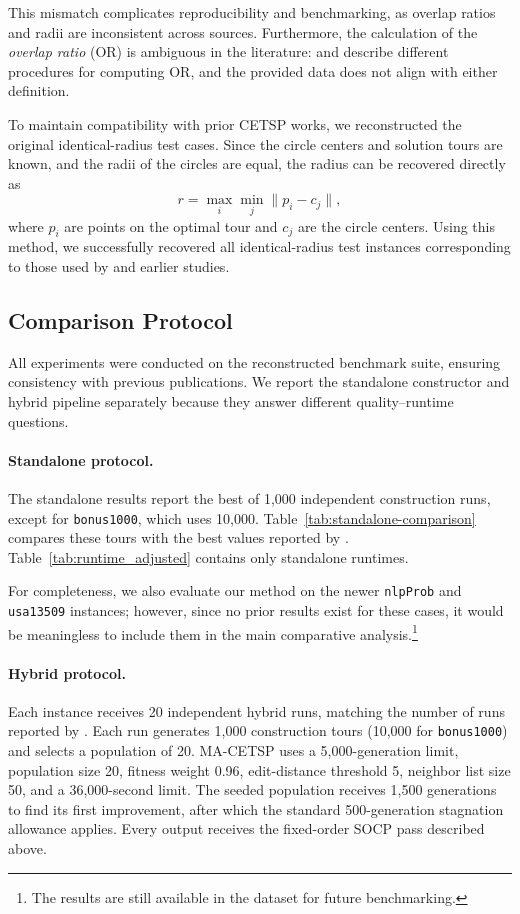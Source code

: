 \documentclass[11pt]{article}
\begin{document}
This mismatch complicates reproducibility and benchmarking, as overlap ratios and radii are inconsistent across sources.
Furthermore, the calculation of the \emph{overlap ratio} (OR) is ambiguous in the literature:
\textcite{Mennell2009} and \textcite{DiPlacido2022} describe different procedures for computing OR, and the provided data does not align with either definition.

To maintain compatibility with prior CETSP works, we reconstructed the original identical-radius test cases.
Since the circle centers and solution tours are known, and the radii of the circles are equal, the radius can be recovered directly as
\begin{equation}
  r = \max_i \min_j \| p_i - c_j \|,
\end{equation}
where \(p_i\) are points on the optimal tour and \(c_j\) are the circle centers.
Using this method, we successfully recovered all identical-radius test instances corresponding to those used by \textcite{LeiHao2024} and earlier studies.

\subsection{Comparison Protocol}

All experiments were conducted on the reconstructed benchmark suite, ensuring consistency with previous publications. We report the standalone constructor and hybrid pipeline separately because they answer different quality--runtime questions.

\paragraph{Standalone protocol.}
The standalone results report the best of 1,000 independent construction runs, except for \texttt{bonus1000}, which uses 10,000. Table~\ref{tab:standalone-comparison} compares these tours with the best values reported by \textcite{LeiHao2024}. Table~\ref{tab:runtime_adjusted} contains only standalone runtimes.

For completeness, we also evaluate our method on the newer \texttt{nlpProb} and \texttt{usa13509} instances; however, since no prior results exist for these cases, it would be meaningless to include them in the main comparative analysis.\footnote{The results are still available in the dataset for future benchmarking.}

\paragraph{Hybrid protocol.}
Each instance receives 20 independent hybrid runs, matching the number of runs reported by \textcite{LeiHao2024}. Each run generates 1,000 construction tours (10,000 for \texttt{bonus1000}) and selects a population of 20. MA-CETSP uses a 5,000-generation limit, population size 20, fitness weight 0.96, edit-distance threshold 5, neighbor list size 50, and a 36,000-second limit. The seeded population receives 1,500 generations to find its first improvement, after which the standard 500-generation stagnation allowance applies. Every output receives the fixed-order SOCP pass described above.
\end{document}
